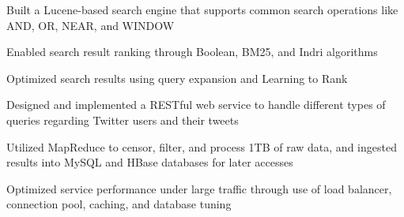 \documentclass[]{deedy-resume-openfont}
\begin{document}
\begin{minipage}[t]{0.64\textwidth}
\descript{}
\begin{tightemize}
\item Built a Lucene-based search engine that supports common search operations like AND, OR, NEAR, and WINDOW
\item Enabled search result ranking through Boolean, BM25, and Indri algorithms
\item Optimized search results using query expansion and Learning to Rank
\end{tightemize}
\sectionsep

\descript{}
\begin{tightemize}
\item Designed and implemented a RESTful web service to handle different types of queries regarding Twitter users and their tweets
\item Utilized MapReduce to censor, filter, and process 1TB of raw data, and ingested results into MySQL and HBase databases for later accesses
\item Optimized service performance under large traffic through use of load balancer, connection pool, caching, and database tuning
\end{tightemize}
\sectionsep


\end{minipage} 
\end{document}

